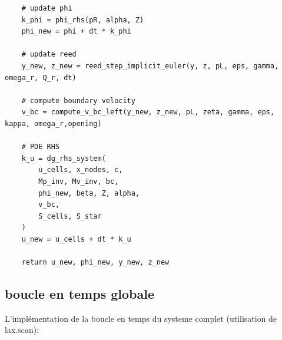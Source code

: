 \documentclass[12pt,a4paper]{article}
\begin{document}
\begin{verbatim}
    # update phi
    k_phi = phi_rhs(pR, alpha, Z)
    phi_new = phi + dt * k_phi

    # update reed
    y_new, z_new = reed_step_implicit_euler(y, z, pL, eps, gamma, omega_r, Q_r, dt)

    # compute boundary velocity
    v_bc = compute_v_bc_left(y_new, z_new, pL, zeta, gamma, eps, kappa, omega_r,opening)

    # PDE RHS
    k_u = dg_rhs_system(
        u_cells, x_nodes, c,
        Mp_inv, Mv_inv, bc,
        phi_new, beta, Z, alpha,
        v_bc,
        S_cells, S_star
    )
    u_new = u_cells + dt * k_u

    return u_new, phi_new, y_new, z_new
\end{verbatim}

\subsection{boucle en temps globale}
L'implémentation de la boucle en temps du systeme complet (utilisation de lax.scan):
\end{document}
